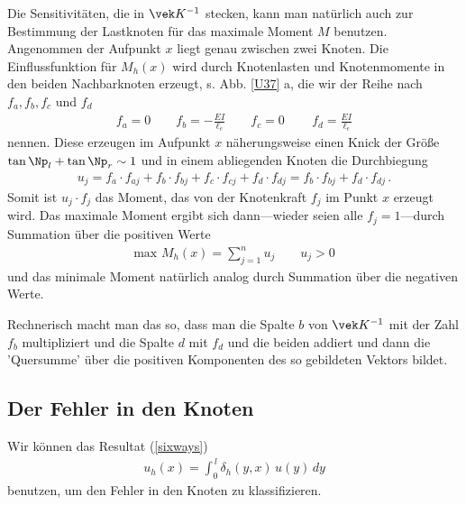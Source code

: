 {{{Die Sensitivit\"{a}ten, die in $\vek K^{-1}$ stecken, kann man nat\"{u}rlich auch zur Bestimmung der Lastknoten f\"{u}r das maximale Moment $M$ benutzen. Angenommen der Aufpunkt $x$ liegt genau zwischen zwei Knoten. Die Einflussfunktion f\"{u}r $M_h(x)$ wird durch Knotenlasten und Knotenmomente in den beiden Nachbarknoten erzeugt, s. Abb. \ref{U37} a, die wir der Reihe nach $f_a, f_b, f_c$ und $f_d$
\begin{align}
f_a = 0 \qquad f_b = -\frac{EI}{\ell_e} \qquad f_c = 0\, \qquad f_d = \frac{EI}{\ell_e}
\end{align}
nennen. Diese erzeugen im Aufpunkt $x$ n\"{a}herungsweise einen Knick der Gr\"{o}{\ss}e $\tan \Np_l + \tan \Np_r \sim 1$ und in einem abliegenden Knoten die Durchbiegung
\begin{align}
u_j = f_a\cdot f_{aj} + f_b\cdot f_{bj} + f_c\cdot f_{cj} + f_d\cdot f_{dj} = f_b\cdot f_{bj} + f_d\cdot f_{dj}\,.
\end{align}
Somit ist $u_j \cdot f_j$ das Moment, das von der Knotenkraft $f_j$ im Punkt $x$ erzeugt wird.
Das maximale Moment ergibt sich dann---wieder seien alle $f_j = 1$---durch Summation \"{u}ber die positiven Werte
\begin{align}
\text{max}\,\, M_h(x) = \sum_{j = 1}^n u_j \qquad u_j > 0
\end{align}
und das minimale Moment nat\"{u}rlich analog durch Summation \"{u}ber die negativen Werte.

Rechnerisch macht man das so, dass man die Spalte $b$ von $\vek K^{-1}$ mit der Zahl $f_b$  multipliziert und die Spalte $d$ mit $f_d$ und die beiden addiert und dann die 'Quersumme' \"{u}ber die positiven Komponenten des so gebildeten Vektors bildet.

{\textcolor{blau2}{\section{Der Fehler in den Knoten}}}
Wir k\"{o}nnen das Resultat (\ref{sixways})
\begin{align}
u_h(x) =\int_0^{\,l}  \delta_h(y,x)\, u(y) \,dy
\end{align}
benutzen, um den Fehler in den Knoten zu klassifizieren.

}}}
